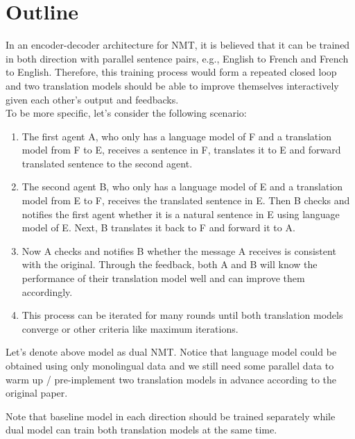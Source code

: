 \documentclass[11pt]{article}
\begin{document}
{\part{Outline}
In an encoder-decoder architecture for NMT, it is believed that it can be trained in both direction with parallel sentence pairs, e.g., English to French and French to English. Therefore, this training process would form a repeated closed loop and two translation models should be able to improve themselves interactively given each other's output and feedbacks.
\\
\newline
\indent To be more specific, let's consider the following scenario:
\begin{enumerate}[label*=\arabic*.]
\item The first agent A, who only has a language model of F and a translation model from F to E, receives a sentence in F, translates it to E and forward translated sentence to the second agent.

\item The second agent B, who only has a language model of E and a translation model from E to F, receives the translated sentence in E. Then B checks and notifies the first agent whether it is a natural sentence in E using language model of E. Next, B translates it back to F and forward it to A.

\item Now A checks and notifies B whether the message A receives is consistent with the original. Through the feedback, both A and B will know the performance of their translation model well and can improve them accordingly.

\item This process can be iterated for many rounds until both translation models converge or other criteria like maximum iterations.
\end{enumerate}
\indent \indent  Let's denote above model as dual NMT. Notice that language model could be obtained using only monolingual data and we still need some parallel data to warm up / pre-implement two translation models in advance according to the original paper\cite{he2016dual}.

Note that baseline model in each direction should be trained separately while dual model can train both translation models at the same time.

}
\end{document}
